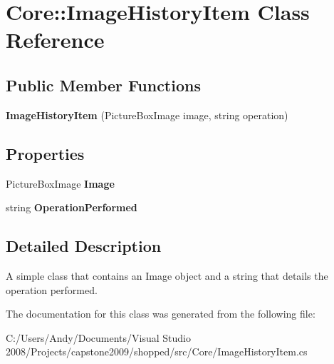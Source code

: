 \hypertarget{class_core_1_1_image_history_item}{
\section{Core::ImageHistoryItem Class Reference}
\label{class_core_1_1_image_history_item}
}
\subsection*{Public Member Functions}
\begin{DoxyCompactItemize}
\item 
\hypertarget{class_core_1_1_image_history_item_a69f3a084c4ce38b48e1eeb2129f3492b}{
{\bfseries ImageHistoryItem} (PictureBoxImage image, string operation)}
\label{class_core_1_1_image_history_item_a69f3a084c4ce38b48e1eeb2129f3492b}

\end{DoxyCompactItemize}
\subsection*{Properties}
\begin{DoxyCompactItemize}
\item 
\hypertarget{class_core_1_1_image_history_item_ad4333281e4f0ca80c6d66803e914693a}{
PictureBoxImage {\bfseries Image}}
\label{class_core_1_1_image_history_item_ad4333281e4f0ca80c6d66803e914693a}

\item 
\hypertarget{class_core_1_1_image_history_item_aa0775d357dd30dafbc2de674b9bcba2b}{
string {\bfseries OperationPerformed}}
\label{class_core_1_1_image_history_item_aa0775d357dd30dafbc2de674b9bcba2b}

\end{DoxyCompactItemize}


\subsection{Detailed Description}
A simple class that contains an Image object and a string that details the operation performed. 

The documentation for this class was generated from the following file:\begin{DoxyCompactItemize}
\item 
C:/Users/Andy/Documents/Visual Studio 2008/Projects/capstone2009/shopped/src/Core/ImageHistoryItem.cs\end{DoxyCompactItemize}
